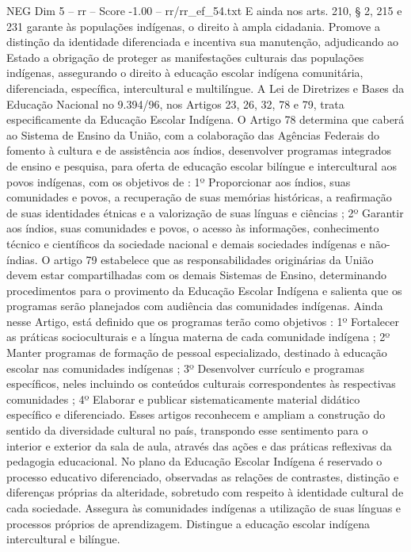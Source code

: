 \begin{textsample}{NEG Dim 5 – rr – Score -1.00 – rr/rr\_ef\_54.txt}
E ainda nos arts. 210, § 2, 215 e 231 garante às populações indígenas, o direito à ampla cidadania.
Promove a distinção da identidade diferenciada e incentiva sua manutenção, adjudicando ao Estado a obrigação de proteger as manifestações culturais das populações indígenas, assegurando o direito à educação escolar indígena comunitária, diferenciada, específica, intercultural e multilíngue.
A Lei de Diretrizes e Bases da Educação Nacional no 9.394/96, nos Artigos 23, 26, 32, 78 e 79, trata especificamente da Educação Escolar Indígena.
O Artigo 78 determina que caberá ao Sistema de Ensino da União, com a colaboração das Agências Federais do fomento à cultura e de assistência aos índios, desenvolver programas integrados de ensino e pesquisa, para oferta de educação escolar bilíngue e intercultural aos povos indígenas, com os objetivos de : 1º Proporcionar aos índios, suas comunidades e povos, a recuperação de suas memórias históricas, a reafirmação de suas identidades étnicas e a valorização de suas línguas e ciências ; 2º Garantir aos índios, suas comunidades e povos, o acesso às informações, conhecimento técnico e científicos da sociedade nacional e demais sociedades indígenas e não-índias.
O artigo 79 estabelece que as responsabilidades originárias da União devem estar compartilhadas com os demais Sistemas de Ensino, determinando procedimentos para o provimento da Educação Escolar Indígena e salienta que os programas serão planejados com audiência das comunidades indígenas.
Ainda nesse Artigo, está definido que os programas terão como objetivos : 1º Fortalecer as práticas socioculturais e a língua materna de cada comunidade indígena ; 2º Manter programas de formação de pessoal especializado, destinado à educação escolar nas comunidades indígenas ; 3º Desenvolver currículo e programas específicos, neles incluindo os conteúdos culturais correspondentes às respectivas comunidades ; 4º Elaborar e publicar sistematicamente material didático específico e diferenciado.
Esses artigos reconhecem e ampliam a construção do sentido da diversidade cultural no país, transpondo esse sentimento para o interior e exterior da sala de aula, através das ações e das práticas reflexivas da pedagogia educacional.
No plano da Educação Escolar Indígena é reservado o processo educativo diferenciado, observadas as relações de contrastes, distinção e diferenças próprias da alteridade, sobretudo com respeito à identidade cultural de cada sociedade.
Assegura às comunidades indígenas a utilização de suas línguas e processos próprios de aprendizagem.
Distingue a educação escolar indígena intercultural e bilíngue.

\end{textsample}
